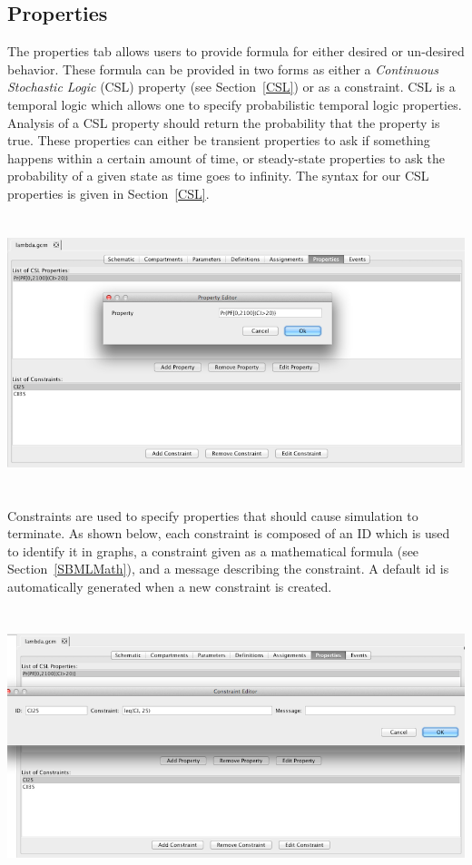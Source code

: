 \documentclass[titlepage,11pt]{article}
\begin{document}
\subsection{\label{Properties}Properties}

The properties tab allows users to provide formula for either desired or un-desired behavior.  These formula can be provided in two forms as either a \emph{Continuous Stochastic Logic} (CSL) property (see Section~\ref{CSL}) or as a constraint.  CSL is a temporal logic which allows one to specify probabilistic temporal logic properties.  Analysis of a CSL property should return the probability that the property is true.  These properties can either be transient properties to ask if something happens within a certain amount of time, or steady-state properties to ask the probability of a given state as time goes to infinity.  The syntax for our CSL properties is given in Section~\ref{CSL}.

\begin{center}
\includegraphics[height=80mm]{screenshots/properties}
\end{center}

\noindent
Constraints are used to specify properties that should cause simulation to terminate.  As shown below, each constraint is composed of an ID which is used to identify it in graphs, a constraint given as a mathematical formula (see Section~\ref{SBMLMath}), and a message describing the constraint.  A default id is automatically generated when a new constraint is created.

\begin{center}
\includegraphics[height=80mm]{screenshots/constraint}
\end{center}
\end{document}
